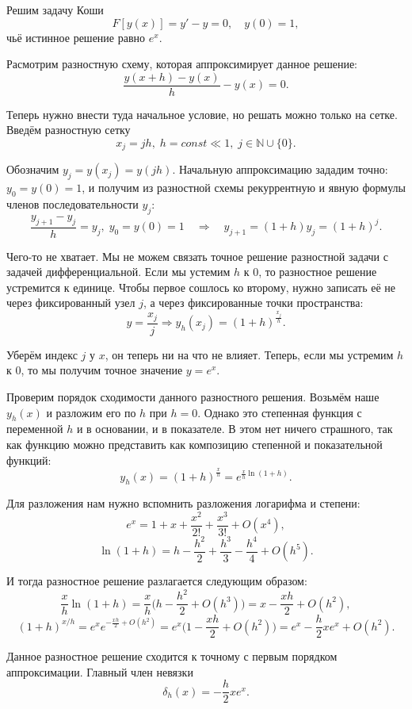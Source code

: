 \documentclass[../main.tex]{subfile}
\begin{document}
\begin{example}
\label{eq:simpliest_difference_solution_example}
	Решим задачу Коши
	\[F[y(x)]=y'-y=0,\quad y(0)=1,\]
	чьё истинное решение равно $e^x$.

	Расмотрим разностную схему, которая аппроксимирует данное решение:
	\[\frac{y(x+h)-y(x)}{h}-y(x)=0.\]

	Теперь нужно внести туда начальное условие, но решать можно только
	на сетке. Введём разностную сетку
	\[x_j=jh,\;h=const\ll 1,\;j\in\mathbb N\cup\{0\}.\]

	Обозначим $y_j=y(x_j)=y(jh)$. Начальную аппроксимацию зададим точно:
	$y_0=y(0)=1$, и получим из разностной схемы рекуррентную и явную формулы
	членов последовательности $y_j$:
	\[\frac{y_{j+1}-y_j}{h}=y_j,\;y_0=y(0)=1\quad\Rightarrow\quad y_{j+1}=
	(1+h)y_j=(1+h)^j.\]

	Чего-то не хватает. Мы не можем связать точное решение разностной задачи
	с задачей дифференциальной. Если мы устемим $h$ к 0, то разностное
	решение устремится к единице. Чтобы первое сошлось ко второму, нужно
	записать её не через фиксированный узел $j$, а через фиксированные
	точки пространства:
	\[y=\frac{x_j}{j}\Rightarrow y_h(x_j)=(1+h)^\frac{x_j}{h}.\]

	Уберём индекс $j$ у $x$, он теперь ни на что не влияет. Теперь, если мы
	устремим $h$ к 0, то мы получим точное значение $y=e^x$.

	Проверим порядок сходимости данного разностного решения. Возьмём наше
	$y_h(x)$ и разложим его по $h$ при $h=0$. Однако это степенная функция
	с переменной $h$ и в основании, и в показателе. В этом нет ничего
	страшного, так как функцию можно представить как композицию степенной
	и показательной функций:
	\[y_h(x)=(1+h)^\frac{x}{h}=e^{\frac{x}{h}\ln(1+h)}.\]

	Для разложения нам нужно вспомнить разложения логарифма и степени:
	\[e^x=1+x+\frac{x^2}{2!}+\frac{x^3}{3!}+O(x^4),\]
	\[\ln(1+h)=h-\frac{h^2}{2}+\frac{h^3}{3}-\frac{h^4}{4}+O(h^5).\]

	И тогда разностное решение разлагается следующим образом:
	\[\frac{x}{h}\ln(1+h)=\frac{x}{h}\big(h-\frac{h^2}{2}
	+O(h^3)\big)=x-\frac{xh}{2}+O(h^2),\]
	\[(1+h)^{x/h}=e^xe^{-\frac{xh}{2}+O(h^2)}=e^x\big(1-\frac{xh}{2}+
	O(h^2)\big)=e^x-\frac{h}{2}xe^x+O(h^2).\]

	Данное разностное решение сходится к точному с первым порядком
	аппроксимации. Главный член невязки
	\[\delta_h(x)=-\frac{h}{2}xe^x.\]
\end{example}
\end{document}
